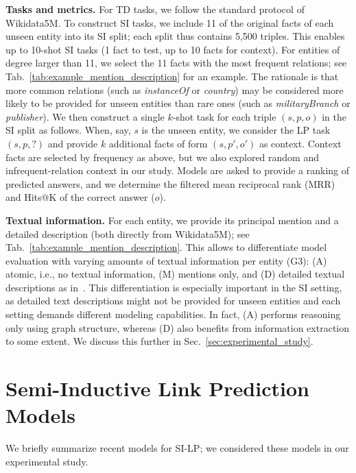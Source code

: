 \documentclass[11pt]{article}
\renewcommand\:{\colon} \newcommand{\sset}[1]{\left\{\,#1\,\right\}} \newcommand{\ssets}[1]{\left\{#1\right\}} \newcommand{\ssetn}[1]{\{\,#1\,\}}
\begin{document}
\textbf{Tasks and metrics.} For TD tasks, we follow the standard protocol of
Wikidata5M. To construct SI tasks, we include 11 of the original facts of each
unseen entity into its SI split; each split thus contains 5,500 triples. This
enables up to 10-shot SI tasks (1 fact to test, up to 10 facts for context). For
entities of degree larger than 11, we select the 11 facts with the most frequent
relations; see Tab.~\ref{tab:example_mention_description} for an example.
The rationale is that more common relations (such as \emph{instanceOf} or
\emph{country}) may be considered more likely to be provided for unseen entities
than rare ones (such as \emph{militaryBranch} or \emph{publisher}). We then
construct a single $k$-shot task for each triple $(s,p,o)$ in the SI split as
follows. When, say, $s$ is the unseen entity, we consider the LP task $(s,p,?)$
and provide $k$ additional facts of form $(s,p',o')$ as context. Context facts
are selected by frequency as above, but we also explored random and infrequent-relation context in our study. Models are asked to provide a ranking of
predicted answers, and we determine the filtered mean reciprocal rank (MRR) and Hits@K of the
correct answer ($o$).

\textbf{Textual information.} For each entity, we provide its principal mention
and a detailed description (both directly from Wikidata5M); see
Tab.~\ref{tab:example_mention_description}. This allows to differentiate
model evaluation with varying amounts of textual information per entity (G3):
(A) atomic, i.e., no textual information, (M) mentions only, and (D) detailed
textual descriptions as in~\cite{kochsiek2023friendly}. This differentiation is
especially important in the SI setting, as detailed text descriptions might not
be provided for unseen entities and each setting demands different modeling
capabilities. In fact, (A) performs reasoning only using graph structure,
whereas (D) also benefits from information extraction to some extent. We discuss
this further in Sec.~\ref{sec:experimental_study}.







\section{Semi-Inductive Link Prediction Models}
\label{sec:model_selection}

We briefly summarize recent models for SI-LP; we considered these models in our experimental study.
\end{document}
